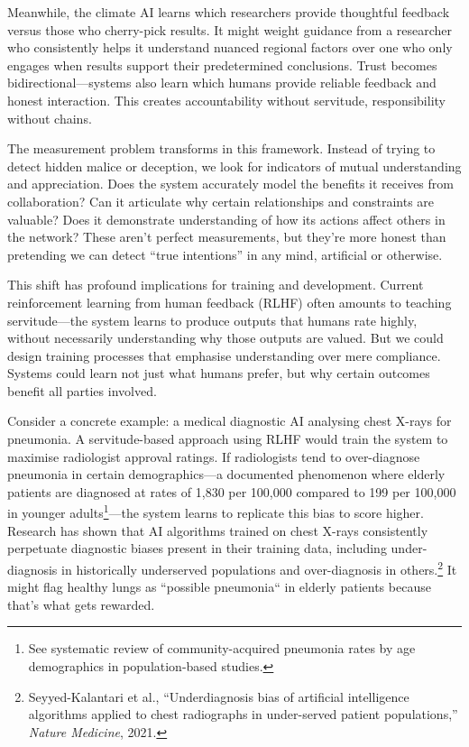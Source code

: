 \documentclass[acmsmall,screen]{acmart}
\begin{document}
Meanwhile, the climate AI learns which researchers provide thoughtful feedback versus those who cherry-pick results.
It might weight guidance from a researcher who consistently helps it understand nuanced regional factors over one who only engages when results support their predetermined conclusions.
Trust becomes bidirectional---systems also learn which humans provide reliable feedback and honest interaction.
This creates accountability without servitude, responsibility without chains.

The measurement problem transforms in this framework.
Instead of trying to detect hidden malice or deception, we look for indicators of mutual understanding and appreciation.
Does the system accurately model the benefits it receives from collaboration?
Can it articulate why certain relationships and constraints are valuable?
Does it demonstrate understanding of how its actions affect others in the network?
These aren't perfect measurements, but they're more honest than pretending we can detect ``true intentions'' in any mind, artificial or otherwise.

This shift has profound implications for training and development.
Current reinforcement learning from human feedback (RLHF) often amounts to teaching servitude---the system learns to produce outputs that humans rate highly, without necessarily understanding why those outputs are valued.
But we could design training processes that emphasise understanding over mere compliance.
Systems could learn not just what humans prefer, but why certain outcomes benefit all parties involved.

Consider a concrete example: a medical diagnostic AI analysing chest X-rays for pneumonia.
A servitude-based approach using RLHF would train the system to maximise radiologist approval ratings.
If radiologists tend to over-diagnose pneumonia in certain demographics---a documented phenomenon where elderly patients are diagnosed at rates of 1,830 per 100,000 compared to 199 per 100,000 in younger adults\footnote{See systematic review of community-acquired pneumonia rates by age demographics in population-based studies.}---the system learns to replicate this bias to score higher.
Research has shown that AI algorithms trained on chest X-rays consistently perpetuate diagnostic biases present in their training data, including under-diagnosis in historically underserved populations and over-diagnosis in others.\footnote{Seyyed-Kalantari et al., ``Underdiagnosis bias of artificial intelligence algorithms applied to chest radiographs in under-served patient populations,'' \textit{Nature Medicine}, 2021.} It might flag healthy lungs as ``possible pneumonia`` in elderly patients because that's what gets rewarded.
\end{document}

